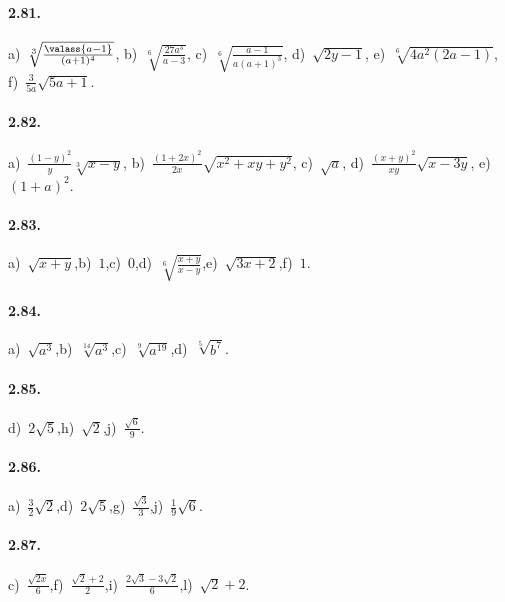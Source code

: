 \paragraph{2.81.}
a)~$\sqrt[3]{\frac{\valass{a-1}}{(a+1)^4}}$,\; b)~$\sqrt[6]{\frac{27a^3}{a-3}}$,\; c)~$\sqrt[6]{\frac{a-1}{a(a+1)^3}}$,\; d)~$\sqrt{2y-1}$,\; e)~$\sqrt[6]{4a^2(2a-1)}$,\; f)~$\frac 3{5a}\sqrt{5a+1}$.

\paragraph{2.82.}
a)~$\frac{(1-y)^2} y\sqrt[3]{x-y}$,\; b)~$\frac{(1+2x)^2}{2x}\sqrt{x^2+xy+y^2}$,\; c)~$\sqrt a$,\; d)~$\frac{(x+y)^2}{xy}\sqrt{x-3y}$,\; e)~$(1+a)^2$.

\paragraph{2.83.}
a)~$\sqrt{x+y}$,\quad b)~$1$,\quad c)~$0$,\quad d)~$\sqrt[6]{\frac{x+y}{x-y}}$,\quad e)~$\sqrt{3x+2}$,\quad f)~$1$.

\paragraph{2.84.}
a)~$\sqrt{a^3}$,\quad b)~$\sqrt[14]{a^3}$,\quad c)~$\sqrt[9]{a^{19}}$,\quad d)~$\sqrt[5]{b^7}$.

\paragraph{2.85.}
d)~$2\sqrt 5$,\quad h)~$\sqrt 2$,\quad j)~$\frac{\sqrt 6} 9$.

\paragraph{2.86.}
a)~$\frac{3}{2}\sqrt 2$,\quad d)~$2\sqrt 5$,\quad g)~$\frac{\sqrt 3} 3$,\quad j)~$\frac{1}{9}\sqrt{6}$.

\paragraph{2.87.}
c)~$\frac{\sqrt{2x}} 6$,\quad f)~$\frac{\sqrt{2}+2}{2}$,\quad i)~$\frac{2\sqrt{3}-3\sqrt{2}}{6}$,\quad l)~$\sqrt{2}+2$.

